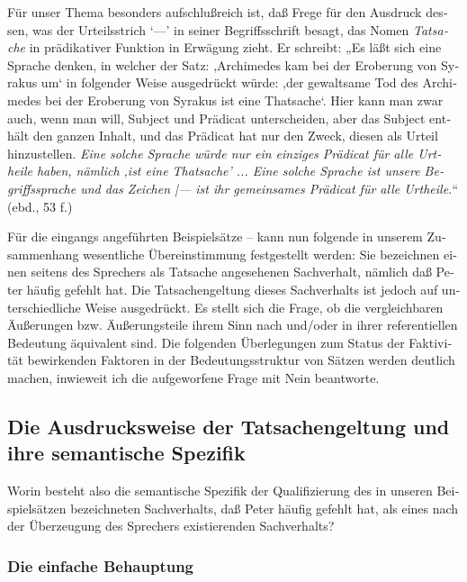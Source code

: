 \documentclass[output=paper]{langscibook}
\begin{document}
\begin{otherlanguage}{german}
Für unser Thema besonders aufschlußreich ist, daß Frege für den Ausdruck dessen, was der Urteilsstrich ‘—’ in seiner Begriffsschrift besagt, das Nomen \textit{Tatsache} in prädikativer Funktion in Erwägung zieht. Er schreibt: „Es läßt sich eine Sprache denken, in welcher der Satz: ,Archimedes kam bei der Eroberung von Syrakus um‘ in folgender Weise ausgedrückt würde: ,der gewaltsame Tod des Archimedes bei der Eroberung von Syrakus ist eine Thatsache‘. Hier kann man zwar auch, wenn man will, Subject und Prädicat unterscheiden, aber das Subject enthält den ganzen Inhalt, und das Prädicat hat nur den Zweck, diesen als Urteil hinzustellen. \textit{Eine solche Sprache würde nur ein einziges Prädicat für alle Urtheile haben, nämlich ,ist eine Thatsache’ ... Eine solche Sprache ist unsere Begriffssprache und das Zeichen |— ist ihr gemeinsames Prädicat für alle Urtheile.}“ (ebd., 53 f.)

Für die eingangs angeführten Beispielsätze -- kann nun folgende in unserem Zusammenhang wesentliche Übereinstimmung festgestellt werden: Sie bezeichnen einen seitens des Sprechers als Tatsache angesehenen Sachverhalt, nämlich daß Peter häufig gefehlt hat. Die Tatsachengeltung dieses Sachverhalts ist jedoch auf unterschiedliche Weise ausgedrückt. Es stellt sich die Frage, ob die vergleichbaren Äußerungen bzw. Äußerungsteile ihrem Sinn nach und/oder in ihrer referentiellen Bedeutung äquivalent sind. Die folgenden Überlegungen zum Status der Faktivität bewirkenden Faktoren in der Bedeutungsstruktur von Sätzen werden deutlich machen, inwieweit ich die aufgeworfene Frage mit Nein beantworte.

\subsection{Die Ausdrucksweise der Tatsachengeltung und ihre semantische Spezifik} \label{sec:zi83:3.4}

Worin besteht also die semantische Spezifik der Qualifizierung des in unseren Beispielsätzen bezeichneten Sachverhalts, daß Peter häufig gefehlt hat, als eines nach der Überzeugung des Sprechers existierenden Sachverhalts?

\subsubsection{Die einfache Behauptung} \label{sec:zi83:3.4.1}


\end{otherlanguage}
\end{document}
